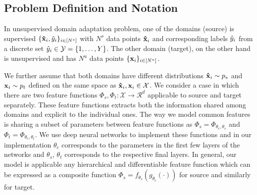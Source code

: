 
\subsection{Problem Definition and Notation}
\label{prob:def}
In unsupervised domain adaptation problem, one of the domains (source) is supervised $\{\mathbf{\hat{x}}_i, \hat{y}_i \}_{i \in [N^s]}$ with $N^s$ data points $\mathbf{\hat{x}}_i$ and corresponding labels $\hat{y}_i$ from a discrete set $\hat{y}_i \in \mathcal{Y} = \{1,\ldots, Y \}$.  The other domain (target), on the other hand is unsupervised and has $N^u$ data points $\{\mathbf{x}_i \}_{i \in [N^u]}$. 

We further assume that both domains have different distributions $\mathbf{\hat{x}}_i \sim p_s$ and $\mathbf{x}_i \sim p_t$ defined on the same space as $\mathbf{\hat{x}}_i,\mathbf{x}_i \in \mathcal{X}$. We consider a case in which there are two feature functions  \mbox{$\Phi_s, \Phi_t:\mathcal{X}\rightarrow \mathcal{R}^d$} applicable to source and target separately. These feature functions extracts both the information shared among domains and explicit to the individual ones. The way we model common features is sharing a subset of parameters between feature functions as \mbox{$\Phi_s=\Phi_{\theta_c,\theta_s}$} and \mbox{$\Phi_t=\Phi_{\theta_c,\theta_t}$}. We use deep neural networks to implement these functions and in our implementation $\theta_c$ corresponds to the parameters in the first few layers of the networks and $\theta_s$, $\theta_t$ corresponds to the respective final layers. In general, our model is applicable any hierarchical and differentiable feature function which can be expressed as a composite function $\Phi_s = f_{\theta_s}(g_{\theta_c}(\cdot))$ for source and similarly for target.

